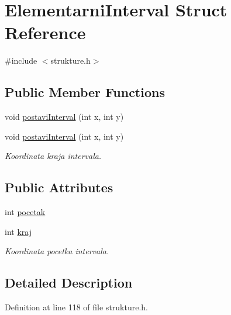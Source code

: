\hypertarget{struct_elementarni_interval}{\section{Elementarni\-Interval Struct Reference}
\label{struct_elementarni_interval}
}


{\ttfamily \#include $<$strukture.\-h$>$}

\subsection*{Public Member Functions}
\begin{DoxyCompactItemize}
\item 
void \hyperlink{struct_elementarni_interval_abec9e697717c2a43dd9596efca635b99}{postavi\-Interval} (int x, int y)
\item 
void \hyperlink{struct_elementarni_interval_abec9e697717c2a43dd9596efca635b99}{postavi\-Interval} (int x, int y)
\begin{DoxyCompactList}\small\item\em Koordinata kraja intervala. \end{DoxyCompactList}\end{DoxyCompactItemize}
\subsection*{Public Attributes}
\begin{DoxyCompactItemize}
\item 
int \hyperlink{struct_elementarni_interval_a1c9c457301eff27c5229e38be6a49419}{pocetak}
\item 
int \hyperlink{struct_elementarni_interval_a448a8542931b1cbf6ad0b073558360e3}{kraj}
\begin{DoxyCompactList}\small\item\em Koordinata pocetka intervala. \end{DoxyCompactList}\end{DoxyCompactItemize}


\subsection{Detailed Description}


Definition at line 118 of file strukture.\-h.



